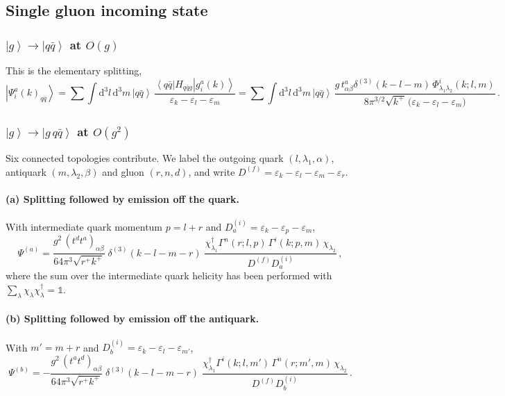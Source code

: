 \documentclass[11pt]{article}
\newcommand{\eps}{\varepsilon}
\newcommand{\dd}{\mathrm{d}}
\newcommand{\dt}[1]{\dd^3 #1\,}
\newcommand{\dg}{\dagger}
\newcommand{\ket}[1]{\left|#1\right\rangle}
\newcommand{\me}[3]{\left\langle #1 \right| #2 \left| #3 \right\rangle}
\newcommand{\dthree}{\delta^{(3)}}
\newcommand{\gl}[3]{g^{#1}_{#2}(#3)}
\newcommand{\Phiv}{\Phi}
\newcommand{\Gam}{\Gamma}
\newcommand{\Hqqg}{H_{q\bar q g}}
\begin{document}
\subsection{Single gluon incoming state}

\subsubsection{$\ket{g}\to\ket{q\bar q}$ at $O(g)$}
This is the elementary splitting,
\begin{equation}
\ket{\Psi^a_i(k)_{q\bar q}}=\sum\int\!\dt{l}\dt{m}\ket{q\bar q}\,
\frac{\me{q\bar q}{\Hqqg}{\gl{a}{i}{k}}}{\eps_k-\eps_l-\eps_m}
=\sum\int\!\dt{l}\dt{m}\ket{q\bar q}\,
\frac{g\,t^a_{\alpha\beta}\dthree(k-l-m)\,\Phiv^i_{\lambda_1\lambda_2}(k;l,m)}
{8\pi^{3/2}\sqrt{k^+}\,\big(\eps_k-\eps_l-\eps_m\big)}\,.
\label{eq:Psigqq}
\end{equation}

\subsubsection{$\ket{g}\to\ket{g\,q\bar q}$ at $O(g^2)$}
\label{sec:gqqg}
Six connected topologies contribute. We label the outgoing quark $(l,\lambda_1,\alpha)$, antiquark
$(m,\lambda_2,\beta)$ and gluon $(r,n,d)$, and write
$D^{(f)}=\eps_k-\eps_l-\eps_m-\eps_r$.

\paragraph{(a) Splitting followed by emission off the quark.} With intermediate quark momentum
$p=l+r$ and $D^{(i)}_a=\eps_k-\eps_p-\eps_m$,
\begin{equation}
\Psi^{(a)}=\frac{g^2\,(t^dt^a)_{\alpha\beta}}{64\pi^3\sqrt{r^+k^+}}\;
\dthree(k-l-m-r)\;
\frac{\chi^\dg_{\lambda_1}\Gam^n(r;l,p)\,\Gam^i(k;p,m)\,\chi_{\lambda_2}}{D^{(f)}D^{(i)}_a}\,,
\end{equation}
where the sum over the intermediate quark helicity has been performed with
$\sum_\lambda\chi_\lambda\chi^\dg_\lambda=\mathbb 1$.

\paragraph{(b) Splitting followed by emission off the antiquark.} With $m'=m+r$ and
$D^{(i)}_b=\eps_k-\eps_l-\eps_{m'}$,
\begin{equation}
\Psi^{(b)}=-\frac{g^2\,(t^at^d)_{\alpha\beta}}{64\pi^3\sqrt{r^+k^+}}\;
\dthree(k-l-m-r)\;
\frac{\chi^\dg_{\lambda_1}\Gam^i(k;l,m')\,\Gam^n(r;m',m)\,\chi_{\lambda_2}}{D^{(f)}D^{(i)}_b}\,.
\end{equation}
\end{document}
